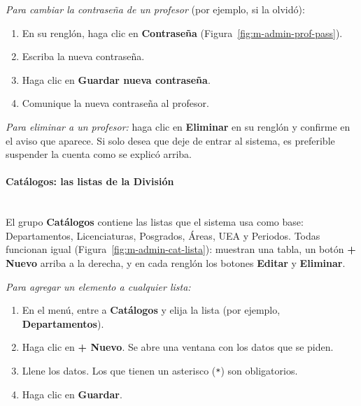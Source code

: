 
\textit{Para cambiar la contraseña de un profesor} (por ejemplo, si la olvidó):
\begin{enumerate}
    \item En su renglón, haga clic en \textbf{Contraseña} (Figura~\ref{fig:m-admin-prof-pass}).
    \item Escriba la nueva contraseña.
    \item Haga clic en \textbf{Guardar nueva contraseña}.
    \item Comunique la nueva contraseña al profesor.
\end{enumerate}


\textit{Para eliminar a un profesor:} haga clic en \textbf{Eliminar} en su renglón y confirme en el aviso que aparece. Si solo desea que deje de entrar al sistema, es preferible suspender la cuenta como se explicó arriba.

\paragraph{Catálogos: las listas de la División}\label{apx:manual-user:admin-catalogos}\mbox{}\\
El grupo \textbf{Catálogos} contiene las listas que el sistema usa como base: Departamentos, Licenciaturas, Posgrados, Áreas, UEA y Periodos. Todas funcionan igual (Figura~\ref{fig:m-admin-cat-lista}): muestran una tabla, un botón \textbf{+ Nuevo} arriba a la derecha, y en cada renglón los botones \textbf{Editar} y \textbf{Eliminar}.


\textit{Para agregar un elemento a cualquier lista:}
\begin{enumerate}
    \item En el menú, entre a \textbf{Catálogos} y elija la lista (por ejemplo, \textbf{Departamentos}).
    \item Haga clic en \textbf{+ Nuevo}. Se abre una ventana con los datos que se piden.
    \item Llene los datos. Los que tienen un asterisco (\texttt{*}) son obligatorios.
    \item Haga clic en \textbf{Guardar}.
\end{enumerate}

